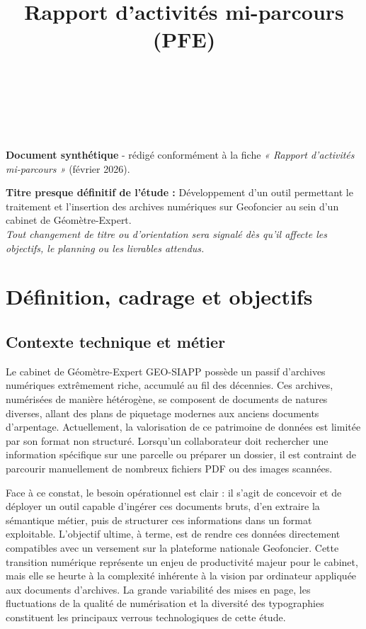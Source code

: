 \documentclass[a4paper,11pt]{article}
\title{\textbf{Rapport d'activités mi-parcours (PFE)}\\[0.6em]\Large \titreEtude}
\author{\textbf{\auteur}\\\specialite\\\structure\\\encadrement}
\date{\dateRapport}
\newcommand{\titreEtude}{Développement d'un outil permettant le traitement et l'insertion des archives numériques sur Geofoncier au sein d'un cabinet de Géomètre-Expert}
\begin{document}
\maketitle

\vspace{1em}
\begin{center}
\textbf{Document synthétique} - rédigé conformément à la fiche \emph{« Rapport d'activités mi-parcours »} (février 2026).
\end{center}
\vspace{1em}

\noindent\textbf{Titre presque définitif de l'étude :} \titreEtude.\\
\textit{Tout changement de titre ou d'orientation sera signalé dès qu'il affecte les objectifs, le planning ou les livrables attendus.}

\newpage
\tableofcontents
\newpage

\section{Définition, cadrage et objectifs}

\subsection{Contexte technique et métier}
Le cabinet de Géomètre-Expert GEO-SIAPP possède un passif d'archives numériques extrêmement riche, accumulé au fil des décennies. Ces archives, numérisées de manière hétérogène, se composent de documents de natures diverses, allant des plans de piquetage modernes aux anciens documents d'arpentage. Actuellement, la valorisation de ce patrimoine de données est limitée par son format non structuré. Lorsqu'un collaborateur doit rechercher une information spécifique sur une parcelle ou préparer un dossier, il est contraint de parcourir manuellement de nombreux fichiers PDF ou des images scannées. 

Face à ce constat, le besoin opérationnel est clair : il s'agit de concevoir et de déployer un outil capable d'ingérer ces documents bruts, d'en extraire la sémantique métier, puis de structurer ces informations dans un format exploitable. L'objectif ultime, à terme, est de rendre ces données directement compatibles avec un versement sur la plateforme nationale Geofoncier. Cette transition numérique représente un enjeu de productivité majeur pour le cabinet, mais elle se heurte à la complexité inhérente à la vision par ordinateur appliquée aux documents d'archives. La grande variabilité des mises en page, les fluctuations de la qualité de numérisation et la diversité des typographies constituent les principaux verrous technologiques de cette étude.
\end{document}
